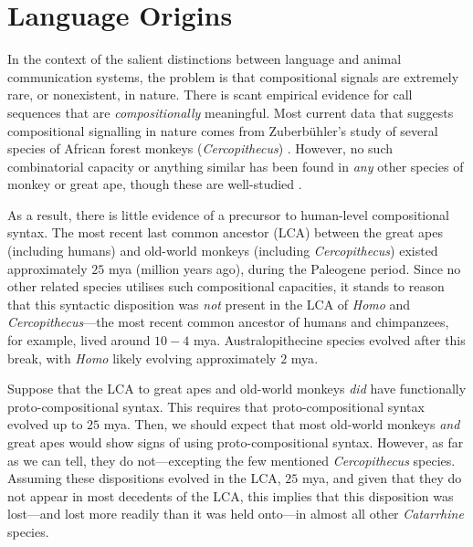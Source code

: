 \documentclass{article}
\begin{document}
\section{Language Origins}

In the context of the salient distinctions between language and animal communication systems, the problem is that compositional signals are extremely rare, or nonexistent, in nature. There is scant empirical evidence for call sequences that are {\it compositionally} meaningful. Most current data that suggests compositional signalling in nature comes from Zuberb{\" u}hler's study of several species of African forest monkeys ({\it Cercopithecus}) \citep{Zuberbuhler-2001, Zuberbuhler-2002, Arnold-Zuberbuhler-2006a, Arnold-Zuberbuhler-2006b, Arnold-Zuberbuhler-2008, Arnold-Zuberbuhler-2013}. However, no such combinatorial capacity or anything similar has been found in {\it any} other species of monkey or great ape, though these are well-studied \citep{Fitch-2010}.

As a result, there is little evidence of a precursor to human-level compositional syntax. The most recent last common ancestor (LCA) between the great apes (including humans) and old-world monkeys (including {\it Cercopithecus}) existed approximately $25$ {\sc mya} (million years ago), during the Paleogene period. Since no other related species utilises such compositional capacities, it stands to reason that this syntactic disposition was {\it not} present in the LCA of {\it Homo} and {\it Cercopithecus}---the most recent common ancestor of humans and chimpanzees, for example, lived around $10-4$ {\sc mya}. Australopithecine species evolved after this break, with {\it Homo} likely evolving approximately $2$ {\sc mya}. 

Suppose that the LCA to great apes and old-world monkeys {\it did} have functionally proto-compositional syntax. This requires that proto-compositional syntax evolved up to $25$ {\sc mya}. Then, we should expect that most old-world monkeys {\it and} great apes would show signs of using proto-compositional syntax. However, as far as we can tell, they do not---excepting the few mentioned {\it Cercopithecus} species. Assuming these dispositions evolved in the LCA, $25$ {\sc mya}, and given that they do not appear in most decedents of the LCA, this implies that this disposition was lost---and lost more readily than it was held onto---in almost all other {\it Catarrhine} species.
\end{document}
